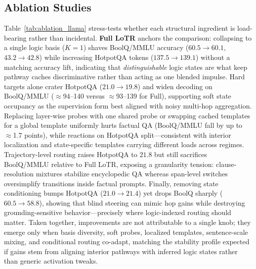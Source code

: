 \subsection{Ablation Studies}
\label{sec:ablation}

Table~\ref{tab:ablation_llama} stress-tests whether each structural ingredient is load-bearing rather than incidental.
\textbf{Full LoTR} anchors the comparison: collapsing to a single logic basis (\(K{=}1\)) shaves BoolQ/MMLU accuracy (\(60.5{\rightarrow}60.1\), \(43.2{\rightarrow}42.8\)) while increasing HotpotQA tokens (\(137.5{\rightarrow}139.1\)) without a matching accuracy lift, indicating that \emph{distinguishable} logic states are what keep pathway caches discriminative rather than acting as one blended impulse.
Hard targets alone crater HotpotQA (\(21.0{\rightarrow}19.8\)) and widen decoding on BoolQ/MMLU (\(\approx\)94--140 versus \(\approx\)93--139 for Full), supporting soft state occupancy as the supervision form best aligned with noisy multi-hop aggregation.
Replacing layer-wise probes with one shared probe or swapping cached templates for a global template uniformly hurts factual QA (BoolQ/MMLU fall by up to \(\approx\)1.7 points), while reactions on HotpotQA split---consistent with interior localization and state-specific templates carrying different loads across regimes.
Trajectory-level routing raises HotpotQA to \(21.8\) but still sacrifices BoolQ/MMLU relative to Full LoTR, exposing a granularity tension: clause-resolution mixtures stabilize encyclopedic QA whereas span-level switches oversimplify transitions inside factual prompts.
Finally, removing state conditioning bumps HotpotQA (\(21.0{\rightarrow}21.4\)) yet drops BoolQ sharply (\(60.5{\rightarrow}58.8\)), showing that blind steering can mimic hop gains while destroying grounding-sensitive behavior---precisely where logic-indexed routing should matter.
Taken together, improvements are not attributable to a single knob; they emerge only when basis diversity, soft probes, localized templates, sentence-scale mixing, and conditional routing co-adapt, matching the stability profile expected if gains stem from aligning interior pathways with inferred logic states rather than generic activation tweaks.

